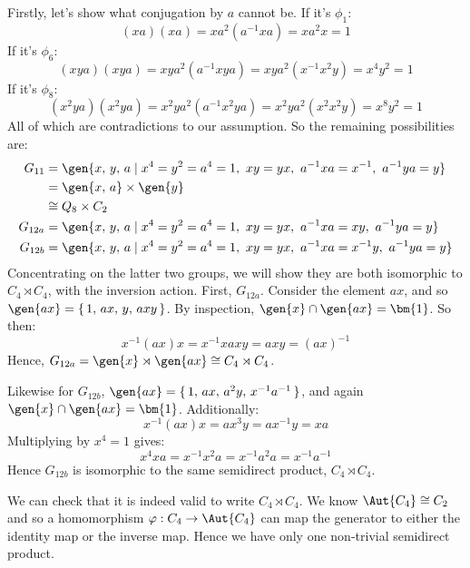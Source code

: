 \begin{enumerate}
\begin{enumerate}[\bfseries A:]
                Firstly, let's show what conjugation by \(a\) cannot be.
                If it's \(\phi_1\):
                \[(xa)(xa) = xa^2(a^{-1}xa) = xa^2 x = 1\]
                If it's \(\phi_6\):
                \[(xya)(xya) = xya^2(a^{-1}xya) = xya^2(x^{-1}x^2y) = x^4 y^2 = 1\]
                If it's \(\phi_8\):
                \[(x^2 ya)(x^2 ya) = x^2 ya^2 (a^{-1}x^2 ya) = x^2 ya^2(x^2 x^2 y) = x^8 y^2 = 1\]
                All of which are contradictions to our assumption.
                So the remaining possibilities are:
                \begin{align*}
                    G_{11} &= \gen{x,\,y,\,a \mid x^4 = y^2 = a^4 = 1,\ xy = yx,\ a^{-1}xa = x^{-1},\ a^{-1}ya = y} \\
                        &= \gen{x,\,a} \times \gen{y} \\
                        &\cong Q_8 \times C_2 \\
                    G_{12a} &= \gen{x,\,y,\,a \mid x^4 = y^2 = a^4 = 1,\ xy = yx,\ a^{-1}xa = xy,\ a^{-1}ya = y} \\
                    G_{12b} &= \gen{x,\,y,\,a \mid x^4 = y^2 = a^4 = 1,\ xy = yx,\ a^{-1}xa = x^{-1}y,\ a^{-1}ya = y}
                \end{align*}
                Concentrating on the latter two groups, we will show they are both isomorphic to \(C_4 \rtimes C_4\),
                with the inversion action.
                First, \(G_{12a}\).
                Consider the element \(ax\), and so \(\gen{ax} = \{\,1,\,ax,\,y,\,axy\,\}\).
                By inspection, \(\gen{x} \cap \gen{ax} = \bm{1}\).
                So then:
                \[x^{-1}(ax)x = x^{-1}xaxy = axy = {(ax)}^{-1}\]
                Hence, \(G_{12a} = \gen{x} \rtimes \gen{ax} \cong C_4 \rtimes C_4\).

                Likewise for \(G_{12b}\), \(\gen{ax} = \{\,1,\,ax,\,a^2 y,\,x^{-1}a^{-1}\,\}\), and again \(\gen{x} \cap
                \gen{ax} = \bm{1}\).
                Additionally:
                \[x^{-1}(ax)x = ax^3 y = ax^{-1}y = xa\]
                Multiplying by \(x^4 = 1\) gives:
                \[x^4 xa = x^{-1}x^2 a = x^{-1}a^2 a = x^{-1}a^{-1}\]
                Hence \(G_{12b}\) is isomorphic to the same semidirect product, \(C_4 \rtimes C_4\).

                We can check that it is indeed valid to write \(C_4 \rtimes C_4\).
                We know \(\Aut{C_4} \cong C_2\) and so a homomorphism \(\varphi:C_4 \to \Aut{C_4}\) can map the
                generator to either the identity map or the inverse map.
                Hence we have only one non-trivial semidirect product.


\end{enumerate}
\end{enumerate}
